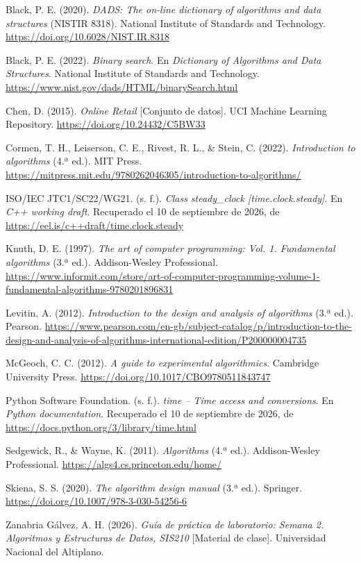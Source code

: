 \documentclass[10pt,a4paper]{article}
\newcommand{\titulo}[1]{\vspace{3pt}{\large\bfseries\color{azul}#1}\par}
\newcommand{\referencia}[1]{\par\begingroup\small\setlength{\hangindent}{1.1em}\setlength{\parskip}{4pt}#1\par\endgroup}
\begin{document}
\titulo{10. Referencias}
\referencia{Black, P. E. (2020). \textit{DADS: The on-line dictionary of algorithms and data structures} (NISTIR 8318). National Institute of Standards and Technology. \url{https://doi.org/10.6028/NIST.IR.8318}}
\referencia{Black, P. E. (2022). \textit{Binary search}. En \textit{Dictionary of Algorithms and Data Structures}. National Institute of Standards and Technology. \url{https://www.nist.gov/dads/HTML/binarySearch.html}}
\referencia{Chen, D. (2015). \textit{Online Retail} [Conjunto de datos]. UCI Machine Learning Repository. \url{https://doi.org/10.24432/C5BW33}}
\referencia{Cormen, T. H., Leiserson, C. E., Rivest, R. L., \& Stein, C. (2022). \textit{Introduction to algorithms} (4.ª ed.). MIT Press. \url{https://mitpress.mit.edu/9780262046305/introduction-to-algorithms/}}
\referencia{ISO/IEC JTC1/SC22/WG21. (s. f.). \textit{Class steady\_clock [time.clock.steady]}. En \textit{C++ working draft}. Recuperado el 10 de septiembre de 2026, de \url{https://eel.is/c++draft/time.clock.steady}}
\referencia{Knuth, D. E. (1997). \textit{The art of computer programming: Vol. 1. Fundamental algorithms} (3.ª ed.). Addison-Wesley Professional. \url{https://www.informit.com/store/art-of-computer-programming-volume-1-fundamental-algorithms-9780201896831}}
\referencia{Levitin, A. (2012). \textit{Introduction to the design and analysis of algorithms} (3.ª ed.). Pearson. \url{https://www.pearson.com/en-gb/subject-catalog/p/introduction-to-the-design-and-analysis-of-algorithms-international-edition/P200000004735}}
\referencia{McGeoch, C. C. (2012). \textit{A guide to experimental algorithmics}. Cambridge University Press. \url{https://doi.org/10.1017/CBO9780511843747}}
\referencia{Python Software Foundation. (s. f.). \textit{time -- Time access and conversions}. En \textit{Python documentation}. Recuperado el 10 de septiembre de 2026, de \url{https://docs.python.org/3/library/time.html}}
\referencia{Sedgewick, R., \& Wayne, K. (2011). \textit{Algorithms} (4.ª ed.). Addison-Wesley Professional. \url{https://algs4.cs.princeton.edu/home/}}
\referencia{Skiena, S. S. (2020). \textit{The algorithm design manual} (3.ª ed.). Springer. \url{https://doi.org/10.1007/978-3-030-54256-6}}
\referencia{Zanabria Gálvez, A. H. (2026). \textit{Guía de práctica de laboratorio: Semana 2. Algoritmos y Estructuras de Datos, SIS210} [Material de clase]. Universidad Nacional del Altiplano.}
\end{document}

